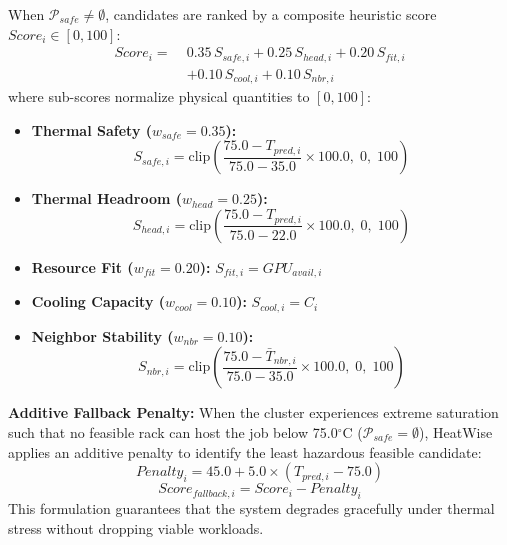 \documentclass[conference,10pt]{IEEEtran}
\begin{document}
When $\mathcal{P}_{safe} \neq \emptyset$, candidates are ranked by a composite heuristic score $Score_i \in [0, 100]$:
\begin{equation}
\label{eq:score}
\begin{split}
Score_i = \; &0.35 \, S_{safe,i} + 0.25 \, S_{head,i} + 0.20 \, S_{fit,i} \\
&+ 0.10 \, S_{cool,i} + 0.10 \, S_{nbr,i}
\end{split}
\end{equation}
where sub-scores normalize physical quantities to $[0, 100]$:
\begin{itemize}
    \item \textbf{Thermal Safety ($w_{safe} = 0.35$):}
    \begin{equation}
    S_{safe,i} = \text{clip}\left(\frac{75.0 - T_{pred,i}}{75.0 - 35.0} \times 100.0, \; 0, \; 100\right)
    \end{equation}
    \item \textbf{Thermal Headroom ($w_{head} = 0.25$):}
    \begin{equation}
    S_{head,i} = \text{clip}\left(\frac{75.0 - T_{pred,i}}{75.0 - 22.0} \times 100.0, \; 0, \; 100\right)
    \end{equation}
    \item \textbf{Resource Fit ($w_{fit} = 0.20$):} $S_{fit,i} = GPU_{avail,i}$
    \item \textbf{Cooling Capacity ($w_{cool} = 0.10$):} $S_{cool,i} = C_i$
    \item \textbf{Neighbor Stability ($w_{nbr} = 0.10$):}
    \begin{equation}
    S_{nbr,i} = \text{clip}\left(\frac{75.0 - \bar{T}_{nbr,i}}{75.0 - 35.0} \times 100.0, \; 0, \; 100\right)
    \end{equation}
\end{itemize}

\textbf{Additive Fallback Penalty:} When the cluster experiences extreme saturation such that no feasible rack can host the job below 75.0$^\circ$C ($\mathcal{P}_{safe} = \emptyset$), HeatWise applies an additive penalty to identify the least hazardous feasible candidate:
\begin{equation}
\label{eq:penalty}
Penalty_i = 45.0 + 5.0 \times (T_{pred,i} - 75.0)
\end{equation}
\begin{equation}
Score_{fallback,i} = Score_i - Penalty_i
\end{equation}
This formulation guarantees that the system degrades gracefully under thermal stress without dropping viable workloads.
\end{document}
